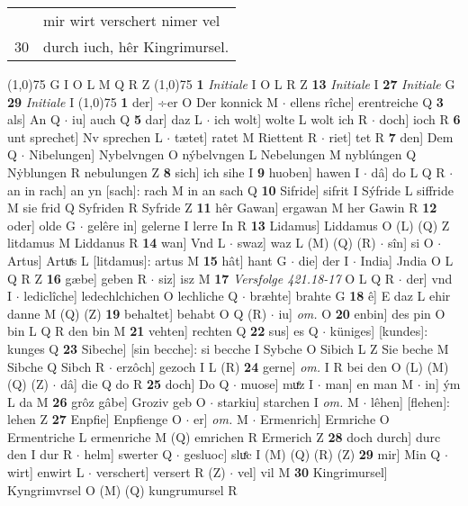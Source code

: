 \documentclass[8pt,a4paper,notitlepage]{article}
\begin{document}
\begin{table}[ht]
\begin{minipage}[t]{0.5\linewidth}
\begin{tabular}{rl}
 & mir wirt verschert nimer vel\\ 
30 & durch iuch, hêr Kingrimursel.\\ 
\end{tabular}
\scriptsize
\line(1,0){75} \newline
G I O L M Q R Z \newline
\line(1,0){75} \newline
\textbf{1} \textit{Initiale} I O L R Z  \textbf{13} \textit{Initiale} I  \textbf{27} \textit{Initiale} G  \textbf{29} \textit{Initiale} I  \newline
\line(1,0){75} \newline
\textbf{1} der] ÷er O Der konnick M  $\cdot$ ellens rîche] erentreiche Q \textbf{3} als] An Q  $\cdot$ iu] auch Q \textbf{5} dar] daz L  $\cdot$ ich wolt] wolte L wolt ich R  $\cdot$ doch] ioch R \textbf{6} unt sprechet] Nv sprechen L  $\cdot$ tætet] ratet M Riettent R  $\cdot$ riet] tet R \textbf{7} den] Dem Q  $\cdot$ Nibelungen] Nybelvngen O nýbelvngen L Nebelungen M nyblúngen Q Nẏblungen R nebulungen Z \textbf{8} sich] ich sihe I \textbf{9} huoben] hawen I  $\cdot$ dâ] do L Q R  $\cdot$ an in rach] an yn [sach]: rach M in an sach Q \textbf{10} Sifride] sifrit I Sýfride L siffride M sie frid Q Syfriden R Syfride Z \textbf{11} hêr Gawan] ergawan M her Gawin R \textbf{12} oder] olde G  $\cdot$ gelêre in] gelerne I lerre In R \textbf{13} Lidamus] Liddamus O (L) (Q) Z litdamus M Liddanus R \textbf{14} wan] Vnd L  $\cdot$ swaz] waz L (M) (Q) (R)  $\cdot$ sîn] si O  $\cdot$ Artus] Artuͯs L [litdamus]: artus M \textbf{15} hât] hant G  $\cdot$ die] der I  $\cdot$ India] Jndia O L Q R Z \textbf{16} gæbe] geben R  $\cdot$ siz] isz M \textbf{17} \textit{Versfolge 421.18-17} O L Q R   $\cdot$ der] vnd I  $\cdot$ lediclîche] ledechlchichen O lechliche Q  $\cdot$ bræhte] brahte G \textbf{18} ê] E daz L ehir danne M (Q) (Z) \textbf{19} behaltet] behabt O Q (R)  $\cdot$ iu] \textit{om.} O \textbf{20} enbin] des pin O bin L Q R den bin M \textbf{21} vehten] rechten Q \textbf{22} sus] es Q  $\cdot$ küniges] [kundes]: kunges Q \textbf{23} Sibeche] [sin becche]: si becche I Sybche O Sibich L Z Sie beche M Sibche Q Sibch R  $\cdot$ erzôch] gezoch I L (R) \textbf{24} gerne] \textit{om.} I R bei den O (L) (M) (Q) (Z)  $\cdot$ dâ] die Q do R \textbf{25} doch] Do Q  $\cdot$ muose] muͤz I  $\cdot$ man] en man M  $\cdot$ in] ým L da M \textbf{26} grôz gâbe] Groziv geb O  $\cdot$ starkiu] starchen I \textit{om.} M  $\cdot$ lêhen] [flehen]: lehen Z \textbf{27} Enpfie] Enpfienge O  $\cdot$ er] \textit{om.} M  $\cdot$ Ermenrich] Ermriche O Ermentriche L ermenriche M (Q) emrichen R Ermerich Z \textbf{28} doch durch] durc den I dur R  $\cdot$ helm] swerter Q  $\cdot$ gesluoc] sluͤc I (M) (Q) (R) (Z) \textbf{29} mir] Min Q  $\cdot$ wirt] enwirt L  $\cdot$ verschert] versert R (Z)  $\cdot$ vel] vil M \textbf{30} Kingrimursel] Kyngrimvrsel O (M) (Q) kungrumursel R \newline

\end{minipage}
\end{table}
\end{document}
